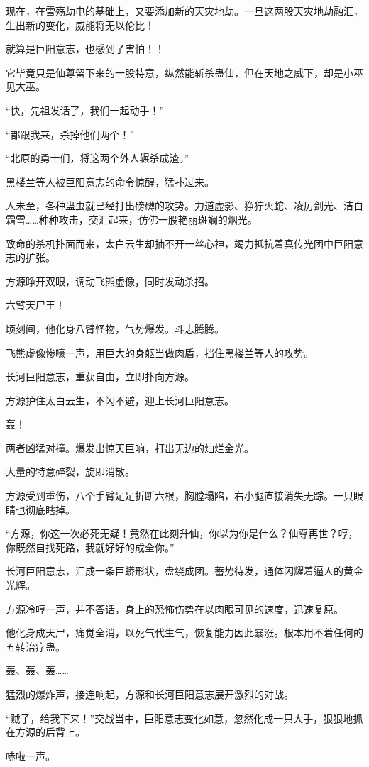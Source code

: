 \begin{this_body}
现在，在雪殇劫电的基础上，又要添加新的天灾地劫。一旦这两股天灾地劫融汇，生出新的变化，威能将无以伦比！

就算是巨阳意志，也感到了害怕！！

它毕竟只是仙尊留下来的一股特意，纵然能斩杀蛊仙，但在天地之威下，却是小巫见大巫。

“快，先祖发话了，我们一起动手！”

“都跟我来，杀掉他们两个！”

“北原的勇士们，将这两个外人辗杀成渣。”

黑楼兰等人被巨阳意志的命令惊醒，猛扑过来。

人未至，各种蛊虫就已经打出磅礴的攻势。力道虚影、狰狞火蛇、凌厉剑光、洁白霜雪……种种攻击，交汇起来，仿佛一股艳丽斑斓的烟光。

致命的杀机扑面而来，太白云生却抽不开一丝心神，竭力抵抗着真传光团中巨阳意志的扩张。

方源睁开双眼，调动飞熊虚像，同时发动杀招。

六臂天尸王！

顷刻间，他化身八臂怪物，气势爆发。斗志腾腾。

飞熊虚像惨嚎一声，用巨大的身躯当做肉盾，挡住黑楼兰等人的攻势。

长河巨阳意志，重获自由，立即扑向方源。

方源护住太白云生，不闪不避，迎上长河巨阳意志。

轰！

两者凶猛对撞。爆发出惊天巨响，打出无边的灿烂金光。

大量的特意碎裂，旋即消散。

方源受到重伤，八个手臂足足折断六根，胸膛塌陷，右小腿直接消失无踪。一只眼睛也彻底瞎掉。

“方源，你这一次必死无疑！竟然在此刻升仙，你以为你是什么？仙尊再世？哼，你既然自找死路，我就好好的成全你。”

长河巨阳意志，汇成一条巨蟒形状，盘绕成团。蓄势待发，通体闪耀着逼人的黄金光辉。

方源冷哼一声，并不答话，身上的恐怖伤势在以肉眼可见的速度，迅速复原。

他化身成天尸，痛觉全消，以死气代生气，恢复能力因此暴涨。根本用不着任何的五转治疗蛊。

轰、轰、轰……

猛烈的爆炸声，接连响起，方源和长河巨阳意志展开激烈的对战。

“贼子，给我下来！”交战当中，巨阳意志变化如意，忽然化成一只大手，狠狠地抓在方源的后背上。

哧啦一声。


\end{this_body}
